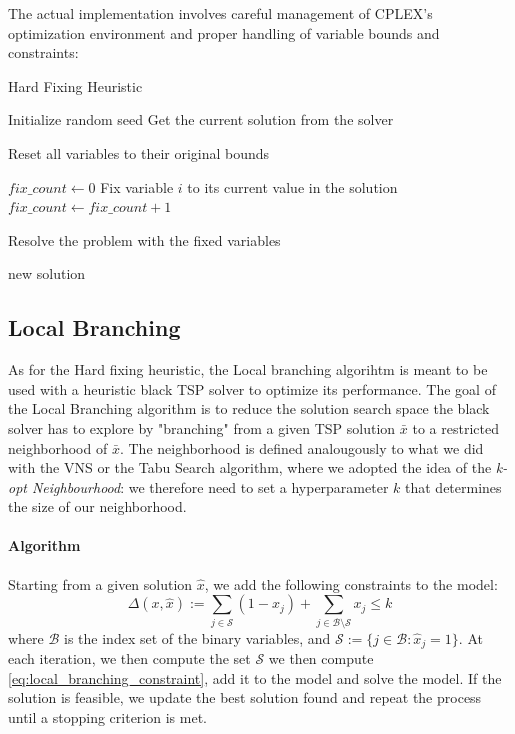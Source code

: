 \documentclass{article}
\begin{document}
The actual implementation involves careful management of CPLEX's optimization environment and proper handling of variable bounds and constraints:


\begin{algorithm}[!ht]
	\caption{Hard Fixing Heuristic}
	\begin{algorithmic}[1]
	\State Initialize random seed
	\State Get the current solution from the solver
	
	\State Reset all variables to their original bounds
	
	\State $fix\_count \gets 0$
			\State Fix variable $i$ to its current value in the solution
			\State $fix\_count \gets fix\_count + 1$
		\EndIf
	\EndFor
	
		\State Resolve the problem with the fixed variables
	\EndIf
	
	\State \Return new solution
	\EndProcedure
	\end{algorithmic}
\end{algorithm}

\newpage

\subsection{Local Branching}
As for the Hard fixing heuristic, the Local branching algorihtm is meant to be used with a heuristic black TSP solver to optimize its performance.
The goal of the Local Branching algorithm is to reduce the solution search space the black solver has to explore by "branching" from a given TSP solution $\bar{x}$ to a restricted neighborhood of $\bar{x}$.
The neighborhood is defined analougously to what we did with the VNS or the Tabu Search algorithm, where we adopted the idea of the \textit{k-opt Neighbourhood}: we therefore need to set a hyperparameter $k$
that determines the size of our neighborhood\cite{Fischetti2003LocalBranching}.

\paragraph{Algorithm}
Starting from a given solution $\hat{x}$, we add the following constraints to the model:
\begin{equation}
	\Delta(x , \hat{x}) := \sum_{j \in \mathcal{S}} (1 - x_j) + \sum_{j \in \mathcal{B} \setminus \mathcal{S}} x_j \leq k
	\label{eq:local_branching_constraint}
\end{equation} 
where $\mathcal{B}$ is the index set of the binary variables, and $\mathcal{S} := \{ j \in \mathcal{B} : \hat{x}_j = 1\}$\cite{Fischetti2003LocalBranching}.  
At each iteration, we then compute the set $\mathcal{S}$ we then compute \ref{eq:local_branching_constraint}, add it to the model and solve the model.
If the solution is feasible, we update the best solution found and repeat the process until a stopping criterion is met.
\end{document}
